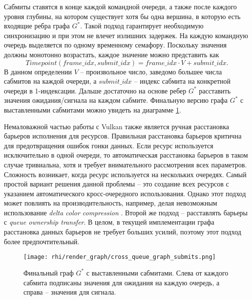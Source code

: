 Сабмиты ставятся в конце каждой командной очереди, а также после каждого уровня глубины, на котором существует хотя бы одна вершина, в которую есть входящие ребра графа $G^*$. Такой подход гарантирует необходимую синхронизацию и при этом не влечет излишних задержек. На каждую командную очередь выделяется по одному временному семафору. Поскольку значения должны монотонно возрастать, каждое значение можно представить как $$Timepoint(frame\_idx, submit\_idx) = frame\_idx \cdot V + submit\_idx \text{.}$$
В данном определении $V$ -- произвольное число, заведомо большее числа сабмитов на каждой очереди, а $submit\_idx$ -- индекс сабмита на конкретной очереди в 1-индексации. Дальше достаточно на основе ребер $G^*$ расставить значения ожидания/сигнала на каждом сабмите. Финальную версию графа $G^*$ с выставленными сабмитами можно увидеть на диаграмме \ref{fig:cross_queue_graph_submits}.

Немаловажной частью работы с Vulkan также является ручная расстановка барьеров исполнения для ресурсов. Правильная расстановка барьеров критична для предотвращения ошибок гонки данных. Если ресурс используется исключительно в одной очереди, то автоматическая расстановка барьеров в таком случае тривиальна, хотя и требует внимательного рассмотрения всех параметров. Сложность возникает, когда ресурс используется на нескольких очередях. Самый простой вариант решения данной проблемы -- это создание всех ресурсов с указанием автоматического кросс-очередного использования. Однако этот подход может повлиять на производительность, например, делая невозможным использование \textit{delta color compression} \cite{optimising_a_aaa_vulkan_title_on_desktop}. Второй же подход -- расставлять барьеры с \textit{queue ownership transfer}. В целом, в текущей имплементации графа расстановка данных барьеров не требует больших усилий, поэтому этот подход более предпочтительный.

\begin{figure}[h]
    \texttt{[image: rhi/render\_graph/cross\_queue\_graph\_submits.png]}
    \caption{Финальный граф $G^*$ с выставленными сабмитами. Слева от каждого сабмита подписаны значения для ожидания на каждую очередь, а справа -- значения для сигнала.}
    \label{fig:cross_queue_graph_submits}
\end{figure}

